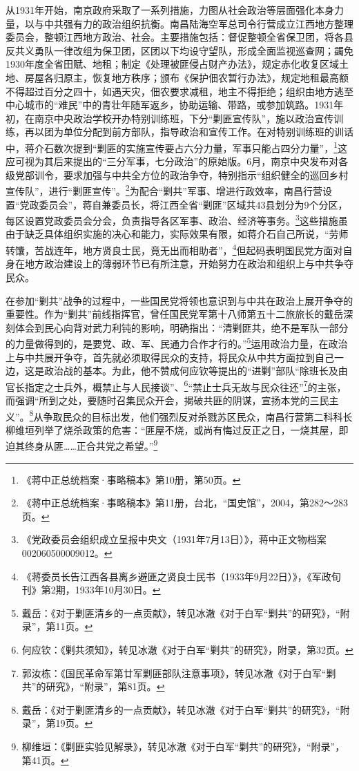 从1931年开始，南京政府采取了一系列措施，力图从社会政治等层面强化本身力量，以与中共强有力的政治组织抗衡。南昌陆海空军总司令行营成立江西地方整理委员会，整顿江西地方政治、社会。主要措施包括：督促整顿全省保卫团，将各县反共义勇队一律改组为保卫团，区团以下均设守望队，形成全面监视巡查网；蠲免1930年度全省田赋、地租；制定《处理被匪侵占财产办法》，规定赤化收复区域土地、房屋各归原主，恢复地方秩序；颁布《保护佃农暂行办法》，规定地租最高额不得超过百分之四十，如遇天灾，佃农要求减租，地主不得拒绝；组织由地方逃至中心城市的“难民”中的青壮年随军返乡，协助运输、带路，或参加筑路。1931年初，在南京中央政治学校开办特别训练班，下分“剿匪宣传队”，施以政治宣传训练，再以团为单位分配到前方部队，指导政治和宣传工作。在对特别训练班的训话中，蒋介石数次提到“剿匪的实施宣传要占六分力量，军事只能占四分力量”，\footnote{《蒋中正总统档案·事略稿本》第10册，第50页。}这应可视为其后来提出的“三分军事，七分政治”的原始版。6月，南京中央发布对各级党部训令，要求加强与中共全方位的政治争夺，特别指示“组织健全的巡回乡村宣传队”，进行“剿匪宣传”。\footnote{《蒋中正总统档案·事略稿本》第11册，台北，“国史馆”，2004，第282～283页。}为配合“剿共”军事、增进行政效率，南昌行营设置“党政委员会”，蒋自兼委员长，将江西全省“剿匪”区域共43县划分为9个分区，每区设置党政委员会分会，负责指导各区军事、政治、经济等事务。\footnote{《党政委员会组织成立呈报中央文（1931年7月13日）》，蒋中正文物档案002060500009012。}这些措施虽由于缺乏具体组织实施的决心和能力，实际效果有限，如蒋介石自己所说，“劳师转馕，苦战连年，地方贤良士民，竟无出而相助者”，\footnote{《蒋委员长告江西各县离乡避匪之贤良士民书（1933年9月22日）》，《军政旬刊》第2期，1933年10月30日。}但起码表明国民党方面对自身在地方政治建设上的薄弱环节已有所注意，开始努力在政治和组织上与中共争夺民众。


在参加“剿共”战争的过程中，一些国民党将领也意识到与中共在政治上展开争夺的重要性。作为“剿共”前线指挥官，曾任国民党军第十八师第五十二旅旅长的戴岳深刻体会到民心向背对武力利钝的影响，明确指出：“清剿匪共，绝不是军队一部分的力量做得到的，是要党、政、军、民通力合作才行的。”\footnote{戴岳：《对于剿匪清乡的一点贡献》，转见冰澈《对于白军“剿共”的研究》，“附录”，第11页。}运用政治力量，在政治上与中共展开争夺，首先就必须取得民众的支持，将民众从中共方面拉到自己一边，这是政治战的基本。为此，他不赞成何应钦等提出的“进剿”部队“除班长及由官长指定之士兵外，概禁止与人民接谈”、\footnote{何应钦：《剿共须知》，转见冰澈《对于白军“剿共”的研究》，附录，第32页。}“禁止士兵无故与民众往还”\footnote{郭汝栋：《国民革命军第廿军剿匪部队注意事项》，转见冰澈《对于白军“剿共”的研究》，“附录”，第81页。}的主张，而强调“所到之处，要随时召集民众开会，揭破共匪的阴谋，宣扬本党的三民主义”。\footnote{戴岳：《对于剿匪清乡的一点贡献》，转见冰澈《对于白军“剿共”的研究》，“附录”，第19页。}从争取民众的目标出发，他们强烈反对杀戮苏区民众，南昌行营第二科科长柳维垣列举了烧杀政策的危害：“匪屋不烧，或尚有悔过反正之日，一烧其屋，即迫其终身从匪……正合共党之希望。”\footnote{柳维垣：《剿匪实验见解录》，转见冰澈《对于白军“剿共”的研究》，“附录”，第41页。}


